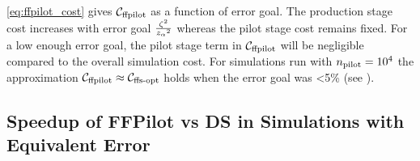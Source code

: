 \eqref{eq:ffpilot_cost} gives ${\mathcal{C}}_{\textrm{ffpilot}}$ as a function of error goal. The production stage cost increases with error goal  $\frac{\zeta {}^2}{z_{\alpha} {}^2}$ whereas the pilot stage cost remains fixed. For a low enough error goal, the pilot stage term in ${\mathcal{C}}_{\textrm{ffpilot}}$ will be negligible compared to the overall simulation cost. For simulations run with $n_{\textrm{pilot}} = 10^4$ the approximation ${\mathcal{C}}_{\textrm{ffpilot}} \approx {\mathcal{C}}_{\textrm{ffs-opt}}$ holds when the error goal was \textless 5\% (see ).

\subsection{Speedup of FFPilot vs DS in Simulations with Equivalent Error}
\label{sec:speedup}


